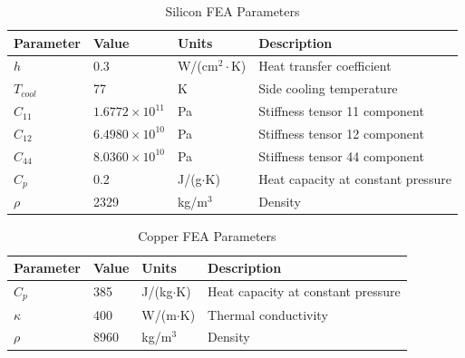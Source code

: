 \documentclass[preprint]{iucr}              %
\begin{document}
\begin{table}

\caption{Silicon FEA Parameters}
\begin{tabular}{@{}llll@{}}
Parameter   & Value                   & Units                     & Description                        \\
\hline
$h$           & 0.3                     & W/(cm$^2\cdot$K)          & Heat transfer coefficient          \\
$T_{cool}$  & 77                      & K                         & Side cooling temperature           \\
$C_{11}$    & $1.6772\times 10^{11}$  & Pa                        & Stiffness tensor 11 component      \\
$C_{12}$    & $6.4980\times 10^{10}$  & Pa                        & Stiffness tensor 12 component      \\
$C_{44}$    & $8.0360\times 10^{10}$  & Pa                        & Stiffness tensor 44 component      \\
$C_p$       & 0.2                     & J/(g$\cdot$K)               & Heat capacity at constant pressure \\
$\rho$      &  2329                   & kg/m$^3$                  & Density                            \\
\end{tabular}
\label{siliconFEA}
\end{table}


\begin{table}

\caption{Copper FEA Parameters}
\begin{tabular}{@{}llll@{}}
Parameter    & Value                  & Units                      & Description                        \\
\hline
$C_p$        & 385                    & J/(kg$\cdot$K)               & Heat capacity at constant pressure \\
$\kappa$     & 400                    & W/(m$\cdot$K)                & Thermal conductivity               \\ 
$\rho$       & 8960                   & kg/m$^3$                   & Density                            \\
\end{tabular}
\label{copperFEA}
\end{table}
\end{document}
